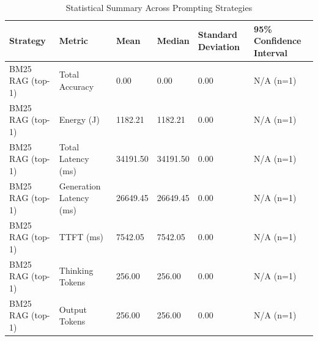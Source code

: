 \begin{table}
\caption{Statistical Summary Across Prompting Strategies}
\label{tab:statistical_summary}
\begin{tabular}{llllll}
\toprule
Strategy & Metric & Mean & Median & Standard Deviation & 95\% Confidence Interval \\
\midrule
BM25 RAG (top-1) & Total Accuracy & 0.00 & 0.00 & 0.00 & N/A (n=1) \\
BM25 RAG (top-1) & Energy (J) & 1182.21 & 1182.21 & 0.00 & N/A (n=1) \\
BM25 RAG (top-1) & Total Latency (ms) & 34191.50 & 34191.50 & 0.00 & N/A (n=1) \\
BM25 RAG (top-1) & Generation Latency (ms) & 26649.45 & 26649.45 & 0.00 & N/A (n=1) \\
BM25 RAG (top-1) & TTFT (ms) & 7542.05 & 7542.05 & 0.00 & N/A (n=1) \\
BM25 RAG (top-1) & Thinking Tokens & 256.00 & 256.00 & 0.00 & N/A (n=1) \\
BM25 RAG (top-1) & Output Tokens & 256.00 & 256.00 & 0.00 & N/A (n=1) \\
\bottomrule
\end{tabular}
\end{table}
